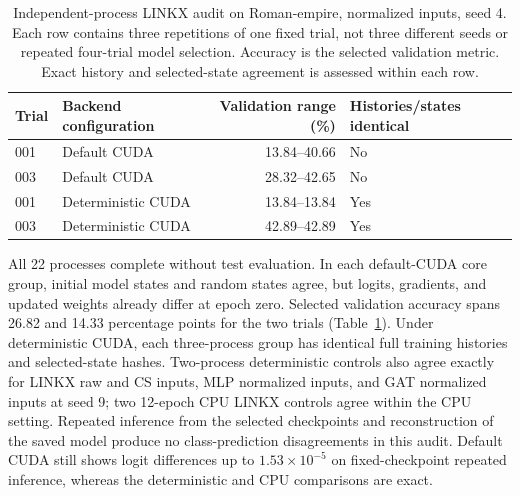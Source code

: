 \begin{table}[ht]
\centering
\caption{Independent-process LINKX audit on Roman-empire, normalized inputs, seed 4. Each row contains three repetitions of one fixed trial, not three different seeds or repeated four-trial model selection. Accuracy is the selected validation metric. Exact history and selected-state agreement is assessed within each row.}
\label{tab:training_reproducibility}
\small
\begin{tabular}{@{}llrl@{}}
\toprule
Trial & Backend configuration & Validation range (\%) & Histories/states identical \\
\midrule
001 & Default CUDA & 13.84--40.66 & No \\
003 & Default CUDA & 28.32--42.65 & No \\
001 & Deterministic CUDA & 13.84--13.84 & Yes \\
003 & Deterministic CUDA & 42.89--42.89 & Yes \\
\bottomrule
\end{tabular}
\end{table}

All 22 processes complete without test evaluation. In each default-CUDA core group, initial model states and random states agree, but logits, gradients, and updated weights already differ at epoch zero. Selected validation accuracy spans 26.82 and 14.33 percentage points for the two trials (Table~\ref{tab:training_reproducibility}). Under deterministic CUDA, each three-process group has identical full training histories and selected-state hashes. Two-process deterministic controls also agree exactly for LINKX raw and CS inputs, MLP normalized inputs, and GAT normalized inputs at seed 9; two 12-epoch CPU LINKX controls agree within the CPU setting. Repeated inference from the selected checkpoints and reconstruction of the saved model produce no class-prediction disagreements in this audit. Default CUDA still shows logit differences up to $1.53\times10^{-5}$ on fixed-checkpoint repeated inference, whereas the deterministic and CPU comparisons are exact.

